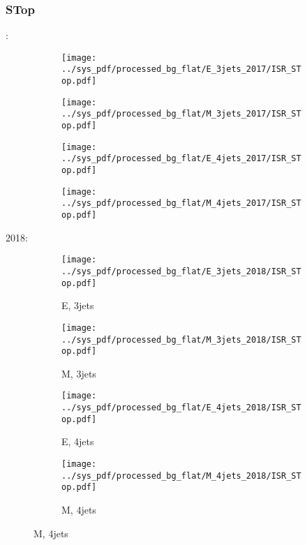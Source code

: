 \documentclass{beamer}
\begin{document}
\begin{frame}
\frametitle{STop}
\fontsize{5}{1}:
\begin{figure}
\centering
\begin{subfigure}[b]{0.24\textwidth}
\texttt{[image: ../sys\_pdf/processed\_bg\_flat/E\_3jets\_2017/ISR\_STop.pdf]}
\end{subfigure}
\begin{subfigure}[b]{0.24\textwidth}
\texttt{[image: ../sys\_pdf/processed\_bg\_flat/M\_3jets\_2017/ISR\_STop.pdf]}
\end{subfigure}
\begin{subfigure}[b]{0.24\textwidth}
\texttt{[image: ../sys\_pdf/processed\_bg\_flat/E\_4jets\_2017/ISR\_STop.pdf]}
\end{subfigure}
\begin{subfigure}[b]{0.24\textwidth}
\texttt{[image: ../sys\_pdf/processed\_bg\_flat/M\_4jets\_2017/ISR\_STop.pdf]}
\end{subfigure}
\end{figure}
2018:
\begin{figure}
\centering
\begin{subfigure}[b]{0.24\textwidth}
\texttt{[image: ../sys\_pdf/processed\_bg\_flat/E\_3jets\_2018/ISR\_STop.pdf]}
\captionsetup{font=tiny}
\caption{E, 3jets}
\end{subfigure}
\begin{subfigure}[b]{0.24\textwidth}
\texttt{[image: ../sys\_pdf/processed\_bg\_flat/M\_3jets\_2018/ISR\_STop.pdf]}
\captionsetup{font=tiny}
\caption{M, 3jets}
\end{subfigure}
\begin{subfigure}[b]{0.24\textwidth}
\texttt{[image: ../sys\_pdf/processed\_bg\_flat/E\_4jets\_2018/ISR\_STop.pdf]}
\captionsetup{font=tiny}
\caption{E, 4jets}
\end{subfigure}
\begin{subfigure}[b]{0.24\textwidth}
\texttt{[image: ../sys\_pdf/processed\_bg\_flat/M\_4jets\_2018/ISR\_STop.pdf]}
\captionsetup{font=tiny}
\caption{M, 4jets}
\end{subfigure}
\end{figure}
\end{frame}
\end{document}
